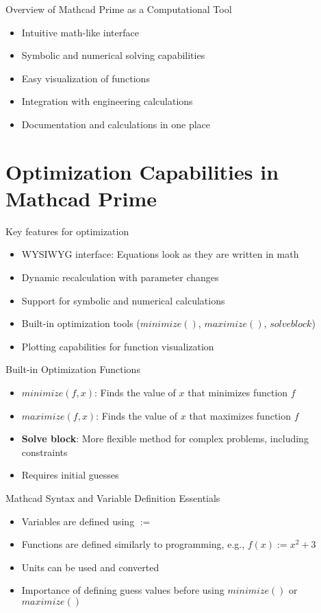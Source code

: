 \documentclass{beamer}
\begin{document}
\begin{frame}{Overview of Mathcad Prime as a Computational Tool}
\begin{itemize}
\item Intuitive math-like interface
\item Symbolic and numerical solving capabilities
\item Easy visualization of functions
\item Integration with engineering calculations
\item Documentation and calculations in one place
\end{itemize}
\end{frame}

\section{Optimization Capabilities in Mathcad Prime}

\begin{frame}{Key features for optimization}
\begin{itemize}
\item WYSIWYG interface: Equations look as they are written in math
\item Dynamic recalculation with parameter changes
\item Support for symbolic and numerical calculations
\item Built-in optimization tools ($minimize()$, $maximize()$, $solve block$)
\item Plotting capabilities for function visualization
\end{itemize}
\end{frame}

\begin{frame}{Built-in Optimization Functions}
\begin{itemize}
\item $minimize(f, x)$: Finds the value of $x$ that minimizes function $f$
\item $maximize(f, x)$: Finds the value of $x$ that maximizes function $f$
\item \textbf{Solve block}: More flexible method for complex problems, including constraints
\item Requires initial guesses
\end{itemize}
\end{frame}

\begin{frame}{Mathcad Syntax and Variable Definition Essentials}
\begin{itemize}
\item Variables are defined using $:=$
\item Functions are defined similarly to programming, e.g., $f(x) := x^2 + 3$
\item Units can be used and converted
\item Importance of defining guess values before using $minimize()$ or $maximize()$
\end{itemize}
\end{frame}
\end{document}
